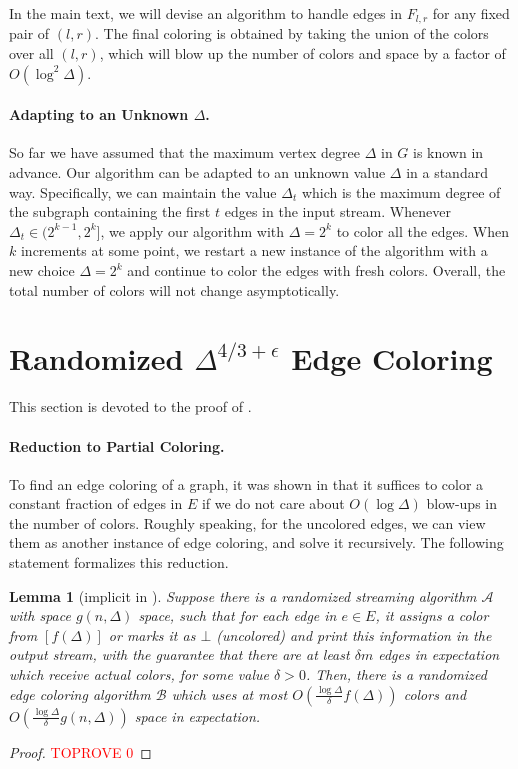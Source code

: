 \documentclass[11pt,a4paper]{article}
\newtheorem{lemma}{Lemma}[section]
\newcommand{\brac}[1]{\left(#1\right)}
\begin{document}
In the main text, we will devise an algorithm to handle edges in $F_{l, r}$ for any fixed pair of $(l, r)$. The final coloring is obtained by taking the union of the colors over all $(l, r)$, which will blow up the number of colors and space by a factor of $O(\log^2\Delta)$.

\paragraph*{Adapting to an Unknown $\Delta$.} So far we have assumed that the maximum vertex degree $\Delta$ in $G$ is known in advance. Our algorithm can be adapted to an unknown value $\Delta$ in a standard way. Specifically, we can maintain the value $\Delta_t$ which is the maximum degree of the subgraph containing the first $t$ edges in the input stream. Whenever $\Delta_t\in (2^{k-1}, 2^{k}]$, we apply our algorithm with $\Delta = 2^k$ to color all the edges. When $k$ increments at some point, we restart a new instance of the algorithm with a new choice $\Delta = 2^k$ and continue to color the edges with fresh colors. Overall, the total number of colors will not change asymptotically. \section{Randomized $\Delta^{4/3+\epsilon}$ Edge Coloring}

This section is devoted to the proof of .

\paragraph*{Reduction to Partial Coloring.} To find an edge coloring of a graph, it was shown in \cite{chechik_et_al:LIPIcs.ICALP.2024.40} that it suffices to color a constant fraction of edges in $E$ if we do not care about $O(\log\Delta)$ blow-ups in the number of colors. Roughly speaking, for the uncolored edges, we can view them as another instance of edge coloring, and solve it recursively. The following statement formalizes this reduction.
\begin{lemma}[implicit in \cite{chechik_et_al:LIPIcs.ICALP.2024.40}]
	Suppose there is a randomized streaming algorithm $\mathcal{A}$ with space $g(n, \Delta)$ space, such that for each edge in $e\in E$, it assigns a color from $[f(\Delta)]$ or marks it as $\bot$ (uncolored) and print this information in the output stream, with the guarantee that there are at least $\delta m$ edges in expectation which receive actual colors, for some value $\delta > 0$. Then, there is a randomized edge coloring algorithm $\mathcal{B}$ which uses at most $O\brac{\frac{\log\Delta}{\delta}f(\Delta)}$ colors and $O\brac{\frac{\log\Delta}{\delta}g(n, \Delta)}$ space in expectation.
\end{lemma}
\begin{proof}\textcolor{red}{TOPROVE 0}\end{proof}
\end{document}
